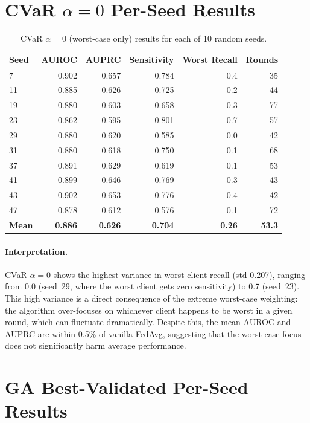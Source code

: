 \documentclass[11pt,a4paper]{report}
\begin{document}
\section{CVaR $\alpha=0$ Per-Seed Results}

\begin{longtable}{lrrrrr}
\caption{CVaR $\alpha=0$ (worst-case only) results for each of 10 random seeds.} \label{tab:cvar0_seeds} \\
\toprule
\textbf{Seed} & \textbf{AUROC} & \textbf{AUPRC} & \textbf{Sensitivity} & \textbf{Worst Recall} & \textbf{Rounds} \\
\midrule
\endhead
7 & 0.902 & 0.657 & 0.784 & 0.4 & 35 \\
11 & 0.885 & 0.626 & 0.725 & 0.2 & 44 \\
19 & 0.880 & 0.603 & 0.658 & 0.3 & 77 \\
23 & 0.862 & 0.595 & 0.801 & 0.7 & 57 \\
29 & 0.880 & 0.620 & 0.585 & 0.0 & 42 \\
31 & 0.880 & 0.618 & 0.750 & 0.1 & 68 \\
37 & 0.891 & 0.629 & 0.619 & 0.1 & 53 \\
41 & 0.899 & 0.646 & 0.769 & 0.3 & 43 \\
43 & 0.902 & 0.653 & 0.776 & 0.4 & 42 \\
47 & 0.878 & 0.612 & 0.576 & 0.1 & 72 \\
\midrule
\textbf{Mean} & \textbf{0.886} & \textbf{0.626} & \textbf{0.704} & \textbf{0.26} & \textbf{53.3} \\
\bottomrule
\end{longtable}

\paragraph{Interpretation.} CVaR $\alpha=0$ shows the highest variance in worst-client recall (std 0.207), ranging from 0.0 (seed~29, where the worst client gets zero sensitivity) to 0.7 (seed~23). This high variance is a direct consequence of the extreme worst-case weighting: the algorithm over-focuses on whichever client happens to be worst in a given round, which can fluctuate dramatically. Despite this, the mean AUROC and AUPRC are within 0.5\% of vanilla FedAvg, suggesting that the worst-case focus does not significantly harm average performance.

\section{GA Best-Validated Per-Seed Results}
\end{document}
